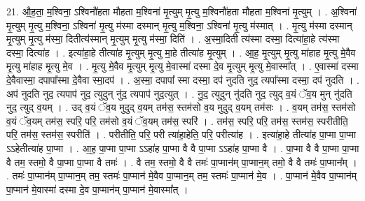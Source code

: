 \documentclass[17pt]{extarticle}
\begin{document}
21. औ॒ह॒ता॒ म॒श्विना॒ ऽश्विनौ॑हता मौहता म॒श्विना॑ मृ॒त्युम् मृ॒त्यु म॒श्विनौ॑हता मौहता म॒श्विना॑ मृ॒त्युम् । . अ॒श्विना॑ मृ॒त्युम् मृ॒त्यु म॒श्विना॒ ऽश्विना॑ मृ॒त्यु म॑स्मा दस्मान् मृ॒त्यु म॒श्विना॒ ऽश्विना॑ मृ॒त्यु म॑स्मात् । . मृ॒त्यु म॑स्मा दस्मान् मृ॒त्युम् मृ॒त्यु म॑स्मा॒ दितीत्य॑स्मान् मृ॒त्युम् मृ॒त्यु म॑स्मा॒ दिति॑ । . अ॒स्मा॒दिती त्य॑स्मा दस्मा॒ दित्या॑हा॒हे त्य॑स्मा दस्मा॒ दित्या॑ह । . इत्या॑हा॒हे तीत्या॑ह मृ॒त्युम् मृ॒त्यु मा॒हे तीत्या॑ह मृ॒त्युम् । . आ॒ह॒ मृ॒त्युम् मृ॒त्यु मा॑हाह मृ॒त्यु मे॒वैव मृ॒त्यु मा॑हाह मृ॒त्यु मे॒व । . मृ॒त्यु मे॒वैव मृ॒त्युम् मृ॒त्यु मे॒वास्मा॑ दस्मा दे॒व मृ॒त्युम् मृ॒त्यु मे॒वास्मा᳚त् । . ए॒वास्मा॑ दस्मा दे॒वैवास्मा॒ दपापा᳚स्मा दे॒वैवा स्मा॒दप॑ । . अ॒स्मा॒ दपापा᳚ स्मा दस्मा॒ दप॑ नुदति नुद॒ त्यपा᳚स्मा दस्मा॒ दप॑ नुदति । . अप॑ नुदति नुद॒ त्यपाप॑ नुद॒ त्युदुन् नु॑द॒ त्यपाप॑ नुद॒त्युत् । . नु॒द॒ त्युदुन् नु॑दति नुद॒ त्युद् व॒यं ॅव॒य मुन् नु॑दति नुद॒ त्युद् व॒यम् । . उद् व॒यं ॅव॒य मुदुद् व॒यम् तम॑स॒ स्तम॑सो व॒य मुदुद् व॒यम् तम॑सः । . व॒यम् तम॑स॒ स्तम॑सो व॒यं ॅव॒यम् तम॑स॒ स्परि॒ परि॒ तम॑सो व॒यं ॅव॒यम् तम॑स॒ स्परि॑ । . तम॑स॒ स्परि॒ परि॒ तम॑स॒ स्तम॑स॒ स्परीतीति॒ परि॒ तम॑स॒ स्तम॑स॒ स्परीति॑ । . परीतीति॒ परि॒ परी त्या॑हा॒हेति॒ परि॒ परीत्या॑ह । . इत्या॑हा॒हे तीत्या॑ह पा॒प्मा पा॒प्मा ऽऽहेतीत्या॑ह पा॒प्मा । . आ॒ह॒ पा॒प्मा पा॒प्मा ऽऽहा॑ह पा॒प्मा वै वै पा॒प्मा ऽऽहा॑ह पा॒प्मा वै । . पा॒प्मा वै वै पा॒प्मा पा॒प्मा वै तम॒ स्तमो॒ वै पा॒प्मा पा॒प्मा वै तमः॑ । . वै तम॒ स्तमो॒ वै वै तमः॑ पा॒प्मान॑म् पा॒प्मान॒म् तमो॒ वै वै तमः॑ पा॒प्मान᳚म् । . तमः॑ पा॒प्मान॑म् पा॒प्मान॒म् तम॒ स्तमः॑ पा॒प्मान॑ मे॒वैव पा॒प्मान॒म् तम॒ स्तमः॑ पा॒प्मान॑ मे॒व । . पा॒प्मान॑ मे॒वैव पा॒प्मान॑म् पा॒प्मान॑ मे॒वास्मा॑ दस्मा दे॒व पा॒प्मान॑म् पा॒प्मान॑ मे॒वास्मा᳚त् । \newline
\end{document}
